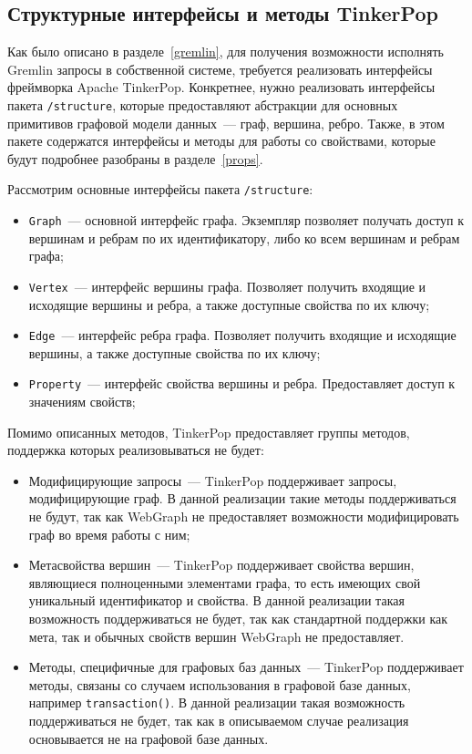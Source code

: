 \documentclass[times,specification,annotation]{itmo-student-thesis}
\begin{document}
\subsection{Структурные интерфейсы и методы TinkerPop}\label{tinkerpop-structure}

Как было описано в разделе~\ref{gremlin}, для получения возможности исполнять Gremlin запросы в собственной системе, требуется реализовать интерфейсы фреймворка Apache TinkerPop. Конкретнее, нужно реализовать интерфейсы пакета \texttt{/structure}, которые предоставляют абстракции для основных примитивов графовой модели данных~--- граф, вершина, ребро. Также, в этом пакете содержатся интерфейсы и методы для работы со свойствами, которые будут подробнее разобраны в разделе~\ref{props}.

Рассмотрим основные интерфейсы пакета \texttt{/structure}:

\begin{itemize}
    \item \texttt{Graph}~--- основной интерфейс графа. Экземпляр позволяет получать доступ к вершинам и ребрам по их идентификатору, либо ко всем вершинам и ребрам графа;
    \item \texttt{Vertex}~--- интерфейс вершины графа. Позволяет получить входящие и исходящие вершины и ребра, а также доступные свойства по их ключу;
    \item \texttt{Edge}~--- интерфейс ребра графа. Позволяет получить входящие и исходящие вершины, а также доступные свойства по их ключу;
    \item \texttt{Property}~--- интерфейс свойства вершины и ребра. Предоставляет доступ к значениям свойств;
\end{itemize}

Помимо описанных методов, TinkerPop предоставляет группы методов, поддержка которых реализовываться не будет:

\begin{itemize}
    \item Модифицирующие запросы~--- TinkerPop поддерживает запросы, модифицирующие граф. В данной реализации такие методы поддерживаться не будут, так как WebGraph не предоставляет возможности модифицировать граф во время работы с ним;
    \item Метасвойства вершин~--- TinkerPop поддерживает свойства вершин, являющиеся полноценными элементами графа, то есть имеющих свой уникальный идентификатор и свойства. В данной реализации такая возможность поддерживаться не будет, так как стандартной поддержки как мета, так и обычных свойств вершин WebGraph не предоставляет.
    \item Методы, специфичные для графовых баз данных~--- TinkerPop поддерживает методы, связаны со случаем использования в графовой базе данных, например \texttt{transaction()}. В данной реализации такая возможность поддерживаться не будет, так как в описываемом случае реализация основывается не на графовой базе данных.
\end{itemize}
\end{document}
